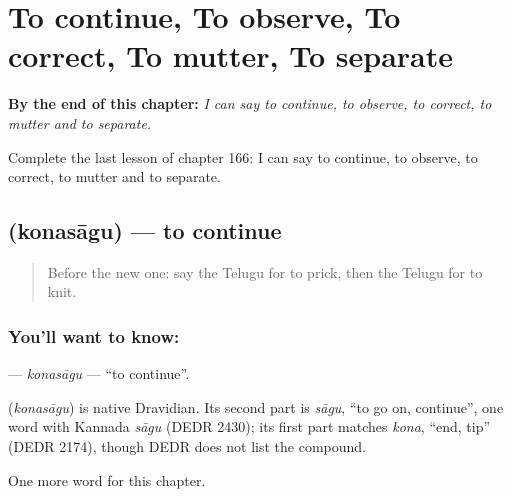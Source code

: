 
\chapter{To continue, To observe, To correct, To mutter, To separate}
\label{ch:te-to-continue-to-observe-to-correct-to-mutter-to-separate}

\begin{chapteropening}
\textbf{By the end of this chapter:} \emph{I can say to continue, to observe, to correct, to mutter and to separate.}

Complete the last lesson of chapter 166: I can say to continue, to observe, to correct, to mutter and to separate.
\end{chapteropening}

\section[\texorpdfstring{\te{కొనసాగు} (konasāgu)}{కొనసాగు (konasāgu)}]{ (konasāgu) — to continue}

\label{lesson:TE-C166-konasagu}



\begin{quote}
Before the new one: say the Telugu for to prick, then the Telugu for to knit.
\end{quote}

\subsection*{You'll want to know: }
\textbf{} — \emph{konasāgu} — \textquotedblleft{}to continue\textquotedblright{}.

\begin{cousinweb}
\textbf{} (\emph{konasāgu}) is native Dravidian. Its second part is \emph{sāgu}, \textquotedblleft{}to go on, continue\textquotedblright{}, one word with Kannada \emph{sāgu} (DEDR 2430); its first part matches \emph{kona}, \textquotedblleft{}end, tip\textquotedblright{} (DEDR 2174), though DEDR does not list the compound.
\end{cousinweb}

\begin{grammarlens}[title={What you've built}]
One more word for this chapter.
\end{grammarlens}

